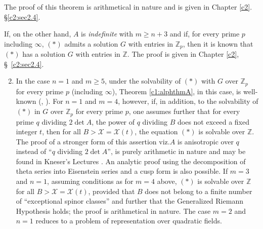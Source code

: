 The proof of this theorem is arithmetical in nature and is given in
Chapter \ref{c2}. \S  \ref{c2:sec2.4}.

\begin{remarks}\label{c1:rems1}
If, on the other hand, $A$ is {\em indefinite} with $m\geq n+3$ and
if, for every prime $p$ including $\infty$, $(\ast)$ admits a solution
$G$ with entries in $\mathbb{Z}_{p}$, then it is known that $(\ast)$
has a solution $G$ with entries in $\mathbb{Z}$. The proof is given in
Chapter \ref{c2}, \S\ \ref{c2:sec2.4}.
\end{remarks}

\begin{enumerate}
\setcounter{enumi}{1}
\item In the case $n=1$ and $m\geq 5$, under the solvability of
  $(\ast)$ with $G$ over $\mathbb{Z}_{p}$ for every prime $p$
  (including $\infty$), Theorem \ref{c1:alphthmA}, in this case, is
  well-known 
  (\cite{key27}, \cite{key4}). For $n=1$ and $m=4$, however, if, in
  addition, to the solvability of $(\ast)$ in $G$ over
  $\mathbb{Z}_{p}$ for every prime $p$, one assumes further that for
  every prime $q$ dividing $2\det A$, the power of $q$ dividing $B$
  does not exceed a fixed integer $t$, then for all
  $B>\mathscr{X}=\mathscr{X}(t)$, the equation $(\ast)$ is solvable
  over $\mathbb{Z}$. The proof of a stronger form of this assertion
  viz.\@ $A$ is anisotropic over $q$ instead of ``$q$ dividing $2\det
  A$'', is purely arithmetic in nature and may be found in Kneser's
  Lectures \cite{key15}. An analytic proof using the\pageoriginale
  decomposition of theta series into Eisenstein series and a cusp form
  is also possible. If $m=3$ and $n=1$, assuming conditions as for
  $m=4$ above, $(\ast)$ is solvable over $\mathbb{Z}$ for all
  $B>\mathscr{X}=\mathscr{X}(t)$, provided that $B$ does not belong to
  a finite number of ``exceptional spinor classes'' and further that
  the Generalized Riemann Hypothesis holds; the proof is arithmetical
  in nature. The case $m=2$ and $n=1$ reduces to a problem of
  representation over quadratic fields.
\end{enumerate}

